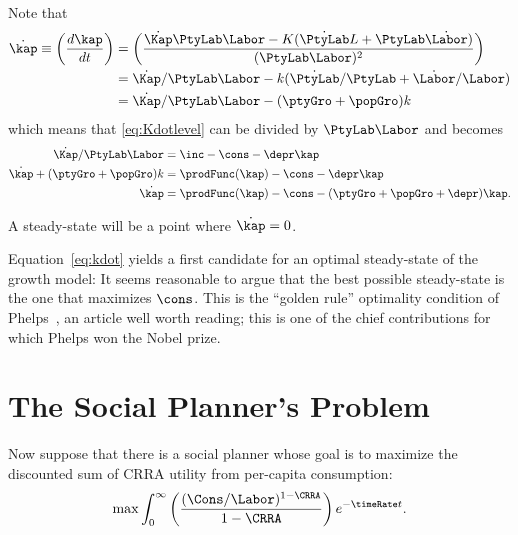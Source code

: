 \documentclass{handout}
\begin{document}
Note that 
\begin{equation}\begin{gathered}\begin{aligned}
  \dot{\kap} \equiv       \left(\frac{d\kap}{dt}\right) & =  \left(\frac{\dot{\Kap}\PtyLab \Labor - K(\dot{\PtyLab }L + \PtyLab \dot{\Labor})}{(\PtyLab \Labor)^{2}}\right) 
  \\   & =  \dot{\Kap}/\PtyLab \Labor - k(\dot{\PtyLab }/{\PtyLab } + \dot{\Labor}/\Labor)
  \\          & =  \dot{\Kap}/\PtyLab \Labor - (\ptyGro +\popGro)k
\end{aligned}\end{gathered}\end{equation}
which means that \eqref{eq:Kdotlevel} can be divided by $\PtyLab \Labor$ and becomes
\begin{equation}\begin{gathered}\begin{aligned}
  \dot{\Kap}/\PtyLab \Labor & =  \inc - \cons - \depr \kap  \\
  \dot{\kap}+(\ptyGro +\popGro)k & =  \prodFunc(\kap) - \cons - \depr \kap  \\
  \dot{\kap} & =  \prodFunc(\kap) - \cons - (\ptyGro +\popGro+\depr) \kap \label{eq:kdot}.
\end{aligned}\end{gathered}\end{equation}

A steady-state will be a point where $\dot{\kap} = 0$.

Equation~\eqref{eq:kdot}  yields a first candidate for an optimal
steady-state of the growth model: It seems reasonable to argue that the best
possible steady-state is the one that maximizes $\cons$.  This is the
``golden rule'' optimality condition of
Phelps~\cite{phelps:golden}, an article well worth reading; this is
one of the chief contributions for which Phelps won the Nobel prize.

\section{The Social Planner's Problem}

Now suppose that there is a social planner whose goal is to maximize the discounted
sum of CRRA utility from per-capita consumption:
\begin{equation}
  \max \int_{0}^{\infty} \left(\frac{(\Cons/\Labor)^{1-\CRRA}}{1-\CRRA}\right) e^{-\timeRate  t} \label{eq:maxprob}.  
\end{equation}
\end{document}
